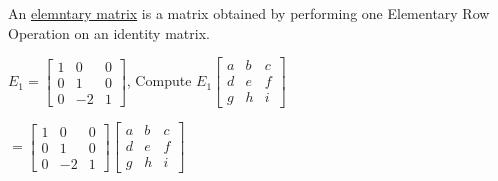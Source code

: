 \documentclass{report}
\begin{document}
\begin{definition}
An \underline{elemntary matrix} is a matrix obtained by performing one Elementary Row Operation on an identity matrix.
\end{definition}

\begin{example}
$E_1=
\begin{bmatrix}
1 & 0 & 0 \\
0 & 1 & 0 \\
0 & -2 & 1
\end{bmatrix}$,
Compute $E_1
\begin{bmatrix}
a & b & c \\
d & e & f \\
g & h & i
\end{bmatrix}$\\\vspace{2mm}

$=
\begin{bmatrix}
	1 & 0 & 0 \\
	0 & 1 & 0 \\
	0 & -2 & 1
\end{bmatrix}
\begin{bmatrix}
	a & b & c \\
	d & e & f \\
	g & h & i
\end{bmatrix}$\\\vspace{2mm}


\end{example}
\end{document}
